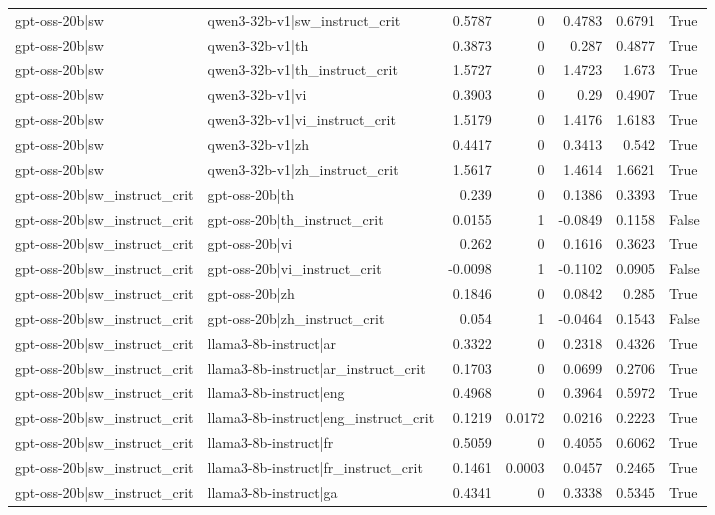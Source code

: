 \begin{table}
\begin{tabular}{l l r r r r l}
gpt-oss-20b|sw & qwen3-32b-v1|sw_instruct_crit & 0.5787 & 0 & 0.4783 & 0.6791 & True \\
gpt-oss-20b|sw & qwen3-32b-v1|th & 0.3873 & 0 & 0.287 & 0.4877 & True \\
gpt-oss-20b|sw & qwen3-32b-v1|th_instruct_crit & 1.5727 & 0 & 1.4723 & 1.673 & True \\
gpt-oss-20b|sw & qwen3-32b-v1|vi & 0.3903 & 0 & 0.29 & 0.4907 & True \\
gpt-oss-20b|sw & qwen3-32b-v1|vi_instruct_crit & 1.5179 & 0 & 1.4176 & 1.6183 & True \\
gpt-oss-20b|sw & qwen3-32b-v1|zh & 0.4417 & 0 & 0.3413 & 0.542 & True \\
gpt-oss-20b|sw & qwen3-32b-v1|zh_instruct_crit & 1.5617 & 0 & 1.4614 & 1.6621 & True \\
gpt-oss-20b|sw_instruct_crit & gpt-oss-20b|th & 0.239 & 0 & 0.1386 & 0.3393 & True \\
gpt-oss-20b|sw_instruct_crit & gpt-oss-20b|th_instruct_crit & 0.0155 & 1 & -0.0849 & 0.1158 & False \\
gpt-oss-20b|sw_instruct_crit & gpt-oss-20b|vi & 0.262 & 0 & 0.1616 & 0.3623 & True \\
gpt-oss-20b|sw_instruct_crit & gpt-oss-20b|vi_instruct_crit & -0.0098 & 1 & -0.1102 & 0.0905 & False \\
gpt-oss-20b|sw_instruct_crit & gpt-oss-20b|zh & 0.1846 & 0 & 0.0842 & 0.285 & True \\
gpt-oss-20b|sw_instruct_crit & gpt-oss-20b|zh_instruct_crit & 0.054 & 1 & -0.0464 & 0.1543 & False \\
gpt-oss-20b|sw_instruct_crit & llama3-8b-instruct|ar & 0.3322 & 0 & 0.2318 & 0.4326 & True \\
gpt-oss-20b|sw_instruct_crit & llama3-8b-instruct|ar_instruct_crit & 0.1703 & 0 & 0.0699 & 0.2706 & True \\
gpt-oss-20b|sw_instruct_crit & llama3-8b-instruct|eng & 0.4968 & 0 & 0.3964 & 0.5972 & True \\
gpt-oss-20b|sw_instruct_crit & llama3-8b-instruct|eng_instruct_crit & 0.1219 & 0.0172 & 0.0216 & 0.2223 & True \\
gpt-oss-20b|sw_instruct_crit & llama3-8b-instruct|fr & 0.5059 & 0 & 0.4055 & 0.6062 & True \\
gpt-oss-20b|sw_instruct_crit & llama3-8b-instruct|fr_instruct_crit & 0.1461 & 0.0003 & 0.0457 & 0.2465 & True \\
gpt-oss-20b|sw_instruct_crit & llama3-8b-instruct|ga & 0.4341 & 0 & 0.3338 & 0.5345 & True \\

\end{tabular}
\end{table}
